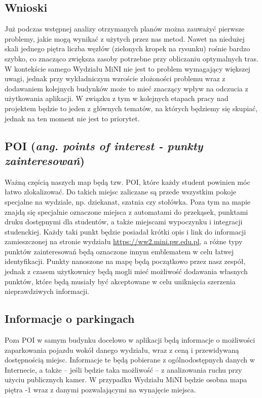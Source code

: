 \documentclass[14pt,a4paper]{extarticle}
\begin{document}
\subsection{Wnioski}
Już podczas wstępnej analizy otrzymanych planów można zauważyć pierwsze problemy, jakie mogą wynikać z użytych przez nas metod. Nawet na niedużej skali jednego piętra liczba węzłów (zielonych kropek na rysunku) rośnie bardzo szybko, co znacząco zwiększa zasoby potrzebne przy obliczaniu optymalnych tras. W kontekście samego Wydziału MiNI nie jest to problem wymagający większej uwagi, jednak przy wykładniczym wzroście złożoności problemu wraz z dodawaniem kolejnych budynków może to mieć znaczący wpływ na odczucia z użytkowania aplikacji. W związku z tym w kolejnych etapach pracy nad projektem będzie to jeden z głównych tematów, na których będziemy się skupiać, jednak na ten moment nie jest to priorytet.

\subsection{POI (\textit{ang. points of interest - punkty zainteresowań})}
Ważną częścią naszych map będą tzw. POI, które każdy student powinien móc łatwo zlokalizować. Do takich miejsc zaliczane są przede wszystkim pokoje specjalne na wydziale, np. dziekanat, szatnia czy stołówka. Poza tym na mapie znajdą się specjalnie oznaczone miejsca z automatami do przekąsek, punktami druku dostępnymi dla studentów, a także miejscami wypoczynku i integracji studenckiej. Każdy taki punkt będzie posiadał krótki opis i link do informacji zamieszczonej na stronie wydziału \url{https://ww2.mini.pw.edu.pl}, a różne typy punktów zainteresowań będą oznaczone innym emblematem w celu łatwej identyfikacji. Punkty nanoszone na mapę będą początkowo przez nasz zespół, jednak z czasem użytkownicy będą mogli mieć możliwość dodawania własnych punktów, które będą musiały być akceptowane w celu uniknięcia szerzenia nieprawdziwych informacji.

\subsection{Informacje o parkingach}
Poza POI w samym budynku docelowo w aplikacji będą informacje o możliwości zaparkowania pojazdu wokół danego wydziału, wraz z ceną i przewidywaną dostępnością miejsc. Informacje te będą pobierane z ogólnodostępnych danych w Internecie, a także -- jeśli będzie taka możliwość -- z analizowania ruchu przy użyciu publicznych kamer. W przypadku Wydziału MiNI będzie osobna mapa piętra -1 wraz z danymi pozwalającymi na wynajęcie miejsca.
\end{document}
